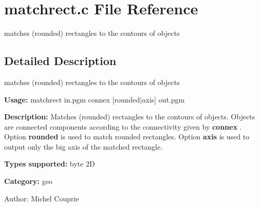 \section{matchrect.c File Reference}
\label{matchrect_8c}
matches (rounded) rectangles to the contours of objects  




\label{_details}
\subsection{Detailed Description}
matches (rounded) rectangles to the contours of objects 

{\bf Usage:} matchrect in.pgm connex [rounded$|$axis] out.pgm

{\bf Description:} Matches (rounded) rectangles to the contours of objects. Objects are connected components according to the connectivity given by {\bf connex} . Option {\bf rounded} is used to match rounded rectangles. Option {\bf axis} is used to output only the big axis of the matched rectangle.

{\bf Types supported:} byte 2D

{\bf Category:} geo

\begin{Desc}
\item[Author:]Michel Couprie \end{Desc}

